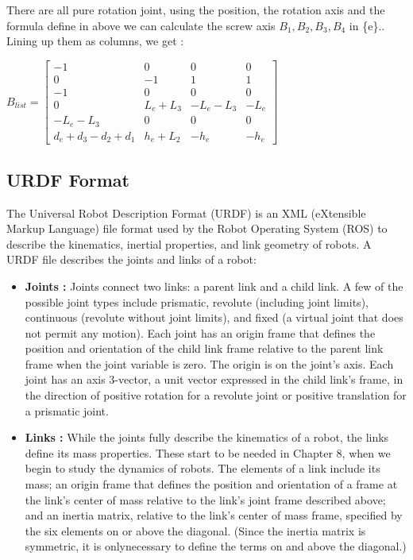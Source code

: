 \bigbreak

There are all pure rotation joint, using the position, the rotation axis and the formula define in above we can calculate the screw axis $B_1,B_2,B_3,B_4$ in \{e\}.. Lining up them as columns, we get : 

\begin{center}
    $B_{list} = 
    \begin{bmatrix}
        -1 & 0 & 0 & 0 \\
        0 & -1 & 1 & 1 \\
        -1 & 0 & 0 & 0 \\
        0 & L_e+L_3 & -L_e-L_3 & -L_e \\
        -L_e-L_3 & 0 & 0 & 0 \\
        d_e+d_3-d_2+d_1 & h_e+L_2 & -h_e & -h_e
    \end{bmatrix}
    $
\end{center}

\subsection{URDF Format}

\hspace{\parindent} The Universal Robot Description Format (URDF) is an XML (eXtensible Markup Language) file format used by the Robot Operating System (ROS) to describe the kinematics, inertial properties, and link geometry of robots. A URDF file describes the joints and links of a robot:

\begin{itemize}
    \item \textbf{Joints :} Joints connect two links: a parent link and a child link. A few of the possible joint types include prismatic, revolute (including joint limits), continuous (revolute without joint limits), and fixed (a virtual joint that does not permit any motion). Each joint has an origin frame that defines the position and orientation of the child link frame relative to the parent link frame when the joint variable is zero. The origin is on the joint's axis. Each joint has an axis 3-vector, a unit vector expressed in the child link's frame, in the direction of positive rotation for a revolute joint or positive translation for a prismatic joint.
    \item \textbf{Links :} While the joints fully describe the kinematics of a robot, the links define its mass properties. These start to be needed in Chapter 8, when we begin to study the dynamics of robots. The elements of a link include its mass; an origin frame that defines the position and orientation of a frame at the link's center of mass relative to the link's joint frame described above; and an inertia matrix, relative to the link's center of mass frame, specified by the six elements on or above the diagonal. (Since the inertia matrix is symmetric, it is onlynecessary to define the terms on and above the diagonal.)
\end{itemize}

